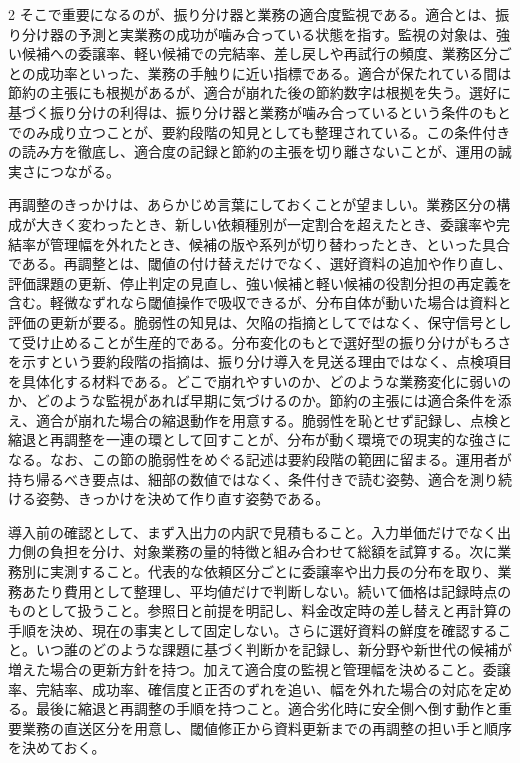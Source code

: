 \documentclass[lualatex,a4paper,10pt]{jlreq}
\begin{document}
\begin{multicols}{2}
そこで重要になるのが、振り分け器と業務の適合度監視である。適合とは、振り分け器の予測と実業務の成功が噛み合っている状態を指す。監視の対象は、強い候補への委譲率、軽い候補での完結率、差し戻しや再試行の頻度、業務区分ごとの成功率といった、業務の手触りに近い指標である。適合が保たれている間は節約の主張にも根拠があるが、適合が崩れた後の節約数字は根拠を失う。選好に基づく振り分けの利得は、振り分け器と業務が噛み合っているという条件のもとでのみ成り立つことが、要約段階の知見としても整理されている\autocite{fragility}。この条件付きの読み方を徹底し、適合度の記録と節約の主張を切り離さないことが、運用の誠実さにつながる。

再調整のきっかけは、あらかじめ言葉にしておくことが望ましい。業務区分の構成が大きく変わったとき、新しい依頼種別が一定割合を超えたとき、委譲率や完結率が管理幅を外れたとき、候補の版や系列が切り替わったとき、といった具合である。再調整とは、閾値の付け替えだけでなく、選好資料の追加や作り直し、評価課題の更新、停止判定の見直し、強い候補と軽い候補の役割分担の再定義を含む。軽微なずれなら閾値操作で吸収できるが、分布自体が動いた場合は資料と評価の更新が要る。脆弱性の知見は、欠陥の指摘としてではなく、保守信号として受け止めることが生産的である。分布変化のもとで選好型の振り分けがもろさを示すという要約段階の指摘は、振り分け導入を見送る理由ではなく、点検項目を具体化する材料である\autocite{fragility}。どこで崩れやすいのか、どのような業務変化に弱いのか、どのような監視があれば早期に気づけるのか。節約の主張には適合条件を添え、適合が崩れた場合の縮退動作を用意する。脆弱性を恥とせず記録し、点検と縮退と再調整を一連の環として回すことが、分布が動く環境での現実的な強さになる。なお、この節の脆弱性をめぐる記述は要約段階の範囲に留まる。運用者が持ち帰るべき要点は、細部の数値ではなく、条件付きで読む姿勢、適合を測り続ける姿勢、きっかけを決めて作り直す姿勢である。

\begin{themeoverview}[振り分け導入の確認事項]
導入前の確認として、まず入出力の内訳で見積もること。入力単価だけでなく出力側の負担を分け、対象業務の量的特徴と組み合わせて総額を試算する。次に業務別に実測すること。代表的な依頼区分ごとに委譲率や出力長の分布を取り、業務あたり費用として整理し、平均値だけで判断しない。続いて価格は記録時点のものとして扱うこと。参照日と前提を明記し、料金改定時の差し替えと再計算の手順を決め、現在の事実として固定しない。さらに選好資料の鮮度を確認すること。いつ誰のどのような課題に基づく判断かを記録し、新分野や新世代の候補が増えた場合の更新方針を持つ。加えて適合度の監視と管理幅を決めること。委譲率、完結率、成功率、確信度と正否のずれを追い、幅を外れた場合の対応を定める。最後に縮退と再調整の手順を持つこと。適合劣化時に安全側へ倒す動作と重要業務の直送区分を用意し、閾値修正から資料更新までの再調整の担い手と順序を決めておく。
\end{themeoverview}

\end{multicols}
\end{document}
